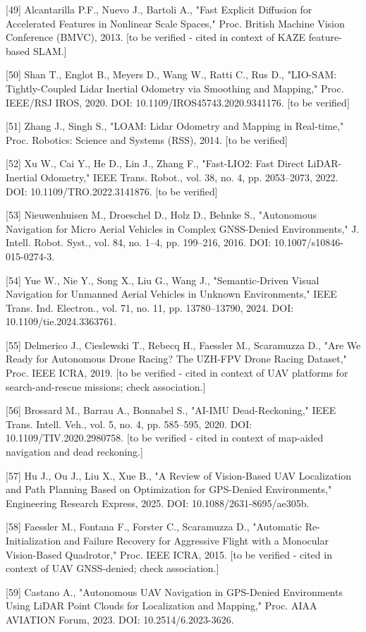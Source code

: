 \documentclass[
]{article}
\begin{document}
{[}49{]} Alcantarilla P.F., Nuevo J., Bartoli A., "Fast Explicit
Diffusion for Accelerated Features in Nonlinear Scale Spaces," Proc.
British Machine Vision Conference (BMVC), 2013. {[}to be verified -
cited in context of KAZE feature-based SLAM.{]}

{[}50{]} Shan T., Englot B., Meyers D., Wang W., Ratti C., Rus D.,
"LIO-SAM: Tightly-Coupled Lidar Inertial Odometry via Smoothing and
Mapping," Proc. IEEE/RSJ IROS, 2020. DOI:
10.1109/IROS45743.2020.9341176. {[}to be verified{]}

{[}51{]} Zhang J., Singh S., "LOAM: Lidar Odometry and Mapping in
Real-time," Proc. Robotics: Science and Systems (RSS), 2014. {[}to be
verified{]}

{[}52{]} Xu W., Cai Y., He D., Lin J., Zhang F., "Fast-LIO2: Fast Direct
LiDAR-Inertial Odometry," IEEE Trans. Robot., vol. 38, no. 4, pp.
2053--2073, 2022. DOI: 10.1109/TRO.2022.3141876. {[}to be verified{]}

{[}53{]} Nieuwenhuisen M., Droeschel D., Holz D., Behnke S., "Autonomous
Navigation for Micro Aerial Vehicles in Complex GNSS-Denied
Environments," J. Intell. Robot. Syst., vol. 84, no. 1--4, pp. 199--216,
2016. DOI: 10.1007/s10846-015-0274-3.

{[}54{]} Yue W., Nie Y., Song X., Liu G., Wang J., "Semantic-Driven
Visual Navigation for Unmanned Aerial Vehicles in Unknown Environments,"
IEEE Trans. Ind. Electron., vol. 71, no. 11, pp. 13780--13790, 2024.
DOI: 10.1109/tie.2024.3363761.

{[}55{]} Delmerico J., Cieslewski T., Rebecq H., Faessler M., Scaramuzza
D., "Are We Ready for Autonomous Drone Racing? The UZH-FPV Drone Racing
Dataset," Proc. IEEE ICRA, 2019. {[}to be verified - cited in context of
UAV platforms for search-and-rescue missions; check association.{]}

{[}56{]} Brossard M., Barrau A., Bonnabel S., "AI-IMU Dead-Reckoning,"
IEEE Trans. Intell. Veh., vol. 5, no. 4, pp. 585--595, 2020. DOI:
10.1109/TIV.2020.2980758. {[}to be verified - cited in context of
map-aided navigation and dead reckoning.{]}

{[}57{]} Hu J., Ou J., Liu X., Xue B., "A Review of Vision-Based UAV
Localization and Path Planning Based on Optimization for GPS-Denied
Environments," Engineering Research Express, 2025. DOI:
10.1088/2631-8695/ae305b.

{[}58{]} Faessler M., Fontana F., Forster C., Scaramuzza D., "Automatic
Re-Initialization and Failure Recovery for Aggressive Flight with a
Monocular Vision-Based Quadrotor," Proc. IEEE ICRA, 2015. {[}to be
verified - cited in context of UAV GNSS-denied; check association.{]}

{[}59{]} Castano A., "Autonomous UAV Navigation in GPS-Denied
Environments Using LiDAR Point Clouds for Localization and Mapping,"
Proc. AIAA AVIATION Forum, 2023. DOI: 10.2514/6.2023-3626.
\end{document}
